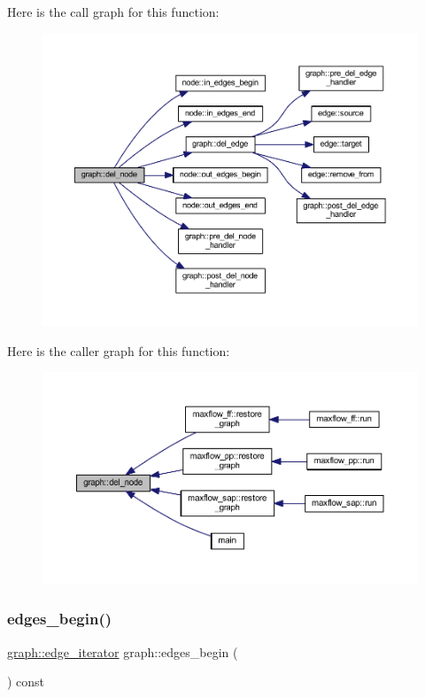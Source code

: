 Here is the call graph for this function\+:
\nopagebreak
\begin{figure}[H]
\begin{center}
\leavevmode
\includegraphics[width=350pt]{classgraph_a8bdc09d5b9ac4bd26586b054d8fcbe91_cgraph}
\end{center}
\end{figure}
Here is the caller graph for this function\+:
\nopagebreak
\begin{figure}[H]
\begin{center}
\leavevmode
\includegraphics[width=350pt]{classgraph_a8bdc09d5b9ac4bd26586b054d8fcbe91_icgraph}
\end{center}
\end{figure}
\mbox{\label{classgraph_a7ba35a4c4e8343ffb27ed6d9703c6f18}} 
\subsubsection{\texorpdfstring{edges\+\_\+begin()}{edges\_begin()}}
{\footnotesize\ttfamily \mbox{\hyperlink{classgraph_a818d3766018eb0af91d520ce2150203c}{graph\+::edge\+\_\+iterator}} graph\+::edges\+\_\+begin (\begin{DoxyParamCaption}{ }\end{DoxyParamCaption}) const}

